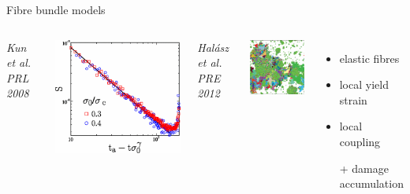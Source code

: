 \begin{frame}{Fibre bundle models}
	\begin{columns}
	\vspace{0.5\baselineskip}
	\textit{\scriptsize Kun et al.  PRL 2008}
	
	\includegraphics[height=6\baselineskip]{Kun_2008_Basquin}
	
	\textit{\scriptsize Halász et al. PRE 2012}
	
	\includegraphics[height=6\baselineskip]{Halasz_2012_crack}
	
	\begin{itemize}
		\item elastic fibres
		\item local yield strain
		\item local coupling
		\item[+] damage accumulation
		\end{itemize}
	

\end{columns}
\end{frame}

